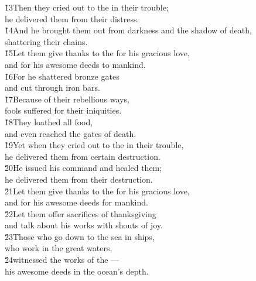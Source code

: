 \begin{poetry}
\poeml \v{13}Then they cried out to the  in their trouble; \\
\poemll    he delivered them from their distress. \\
\poeml \v{14}And he brought them out from darkness and the shadow of death, \\
\poemll    shattering their chains. \\
\poeml \v{15}Let them give thanks to the  for his gracious love, \\
\poemll    and for his awesome deeds to mankind. \\
\poeml \v{16}For he shattered bronze gates \\
\poemll    and cut through iron bars. \\
\poeml \v{17}Because of their rebellious ways, \\
\poemll    fools suffered for their iniquities. \\
\poeml \v{18}They loathed all food, \\
\poemll    and even reached the gates of death. \\
\poeml \v{19}Yet when they cried out to the  in their trouble, \\
\poemll    he delivered them from certain destruction. \\
\poeml \v{20}He issued his command and healed them; \\
\poemll    he delivered them from their destruction. \\
\poeml \v{21}Let them give thanks to the  for his gracious love, \\
\poemll    and for his awesome deeds for mankind. \\
\poeml \v{22}Let them offer sacrifices of thanksgiving \\
\poemll    and talk about his works with shouts of joy. \\
\poeml \v{23}Those who go down to the sea in ships, \\
\poemll    who work in the great waters, \\
\poeml \v{24}witnessed the works of the --- \\
\poemll    his awesome deeds in the ocean's depth. \\

\end{poetry}
